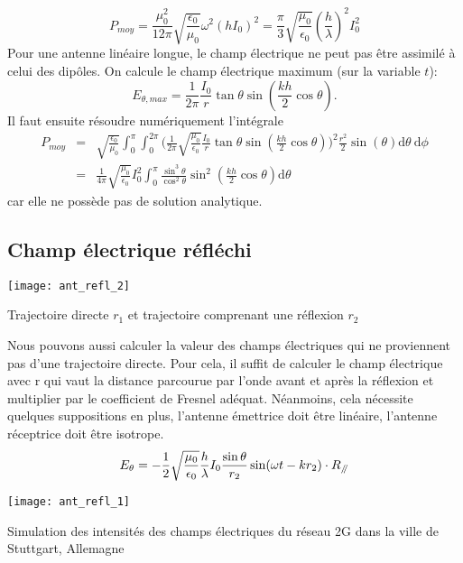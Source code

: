 \[P_{moy}=\frac{\mu_0^2}{12\pi}\sqrt{\frac{\epsilon_{0}}{\mu_0}}
\omega^2(hI_0)^2=\frac{\pi}{3}\sqrt{\frac{\mu_0}{\epsilon_{0}}}\left(\frac{h}{\lambda}\right)^2I_0^2
\]
Pour une antenne linéaire longue, le champ électrique ne peut pas être assimilé à celui des dipôles. On calcule le champ électrique maximum (sur la variable $t$):
\[E_{\theta,max}=\frac{1}{2\pi}\frac{I_0}{r}\tan \theta\sin\left(\frac{kh}{2}\cos\theta\right).\]
Il faut ensuite résoudre numériquement l'intégrale 
\begin{align*}
P_{moy}&=&\sqrt{\frac{\epsilon_{0}}{\mu_0}}\int_0^{\pi}\int_0^{2\pi}\bigg(\frac{1}{2\pi}\sqrt{\frac{\mu_0}{\epsilon_{0}}}\frac{I_0}{r}\tan \theta\sin\left(\frac{kh}{2}\cos\theta\right)\bigg)^2\frac{r^2}{2}\sin(\theta)\textrm{d}\theta\:\textrm{d}\phi\\
&=&\frac{1}{4\pi} \sqrt{\frac{\mu_0}{\epsilon_{0}}}I_0^2\int_0^{\pi}\frac{\sin^3\theta}{\cos^2\theta}\sin^2\left(\frac{kh}{2}\cos\theta\right)\textrm{d}\theta
\end{align*}
car elle ne possède pas de solution analytique.

\subsection{Champ électrique réfléchi}

\begin{marginfigure}[-2cm]
	\texttt{[image: ant\_refl\_2]}
	\caption{Trajectoire directe $r_1$ et trajectoire comprenant une réflexion $r_2$}
\end{marginfigure}
Nous pouvons aussi calculer la valeur des champs électriques qui ne proviennent pas d'une trajectoire directe. Pour cela, il suffit de calculer le champ électrique avec r qui vaut la distance parcourue par l'onde avant et après la réflexion et multiplier par le coefficient de Fresnel adéquat. Néanmoins, cela nécessite quelques suppositions en plus, l'antenne émettrice doit être linéaire, l'antenne réceptrice doit être isotrope.
\[E_\theta=-\frac{1}{2}\sqrt{\frac{\mu_0}{\epsilon_{0}}}\frac{h}{\lambda}I_0\frac{\sin \theta}{r_{2}}\sin(\omega t-kr_{2})\cdot R_{\mathbin{/\mkern-5mu/}}\]
\begin{marginfigure}[-2cm]
	\texttt{[image: ant\_refl\_1]}
	\caption{Simulation des intensités des champs électriques du réseau 2G dans la ville de Stuttgart, Allemagne}
\end{marginfigure} 


